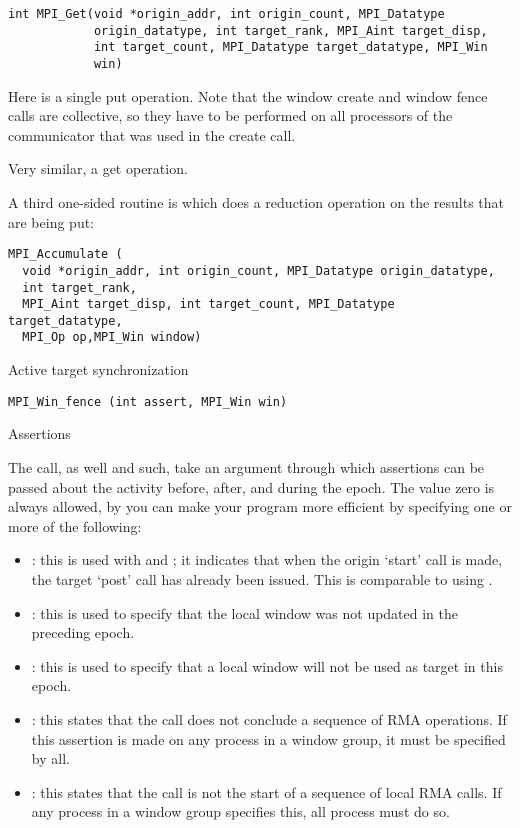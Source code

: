 \begin{verbatim}
int MPI_Get(void *origin_addr, int origin_count, MPI_Datatype
            origin_datatype, int target_rank, MPI_Aint target_disp,
            int target_count, MPI_Datatype target_datatype, MPI_Win
            win)
\end{verbatim}

Here is a single put operation. Note that the window create and window fence calls
are collective, so they have to be performed on all processors
of the communicator that was used in the create call.

Very similar, a get operation.

A third one-sided routine
is  which does a reduction operation on the results
that are being put:
\begin{verbatim}
MPI_Accumulate (
  void *origin_addr, int origin_count, MPI_Datatype origin_datatype, 
  int target_rank,
  MPI_Aint target_disp, int target_count, MPI_Datatype target_datatype,
  MPI_Op op,MPI_Win window)
\end{verbatim}

 {Active target synchronization}

\begin{verbatim}
MPI_Win_fence (int assert, MPI_Win win)
\end{verbatim}

 {Assertions}
\label{sec:mpi-assert}

The  call, as well  and such, take an argument
through which assertions can be passed about the activity before, after, and during the epoch.
The value zero is always allowed, by you can make your program more efficient by specifying
one or more of the following:
\begin{itemize}
\item {}: this is used with
   and ; it
  indicates that when the origin `start' call is made, the target
  `post' call has already been issued. This is comparable to using
  .
\item {}: this is used to specify that
  the local window was not updated in the preceding epoch.
\item {}: this is used to specify that a local
  window will not be used as target in this epoch.
\item {}: this states that the
   call does not conclude a sequence of
  RMA operations. If this assertion is made on any process in a window group,
  it must be specified by all.
\item {}: this states that the
   call is not the start of a sequence of
  local RMA calls. If any process in a window group specifies this,
  all process must do so.
\end{itemize}

